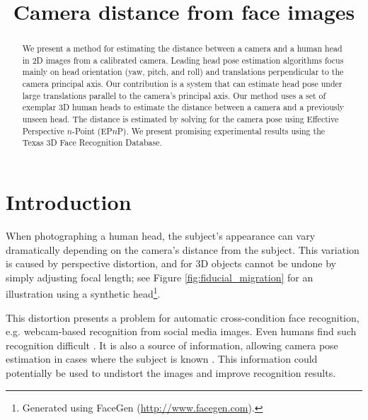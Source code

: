 \documentclass[runningheads]{llncs}
\begin{document}
\pagestyle{headings}

\mainmatter

\title{Camera distance from face images}


\maketitle

\begin{abstract}
We present a method for estimating the distance between a camera and a human head in 2D images from a calibrated camera.
Leading head pose estimation algorithms focus mainly on head orientation (yaw, pitch, and roll) and translations perpendicular to the camera principal axis.
Our contribution is a system that can estimate head pose under large translations parallel to the camera's principal axis.
Our method uses a set of exemplar 3D human heads to estimate the distance between a camera and a previously unseen head.
The distance is estimated by solving for the camera pose using Effective Perspective $n$-Point (EP$n$P).  
We present promising experimental results using the Texas 3D Face Recognition Database.
\end{abstract}

\section{Introduction}
When photographing a human head, the subject's appearance can vary dramatically depending on the camera's distance from the subject.
This variation is caused by perspective distortion, and for 3D objects cannot be undone by simply adjusting focal length; see Figure \ref{fig:fiducial_migration} for an illustration using a synthetic head\footnote{Generated using FaceGen (\url{http://www.facegen.com}).}.

This distortion presents a problem for automatic cross-condition face recognition, e.g. webcam-based recognition from social media images.
Even humans find such recognition difficult \cite{liu2003face,liu2006face}.
It is also a source of information, allowing camera pose estimation in cases where the subject is known \cite{ohayon2006robust}.
This information could potentially be used to undistort the images and improve recognition results.
\end{document}
